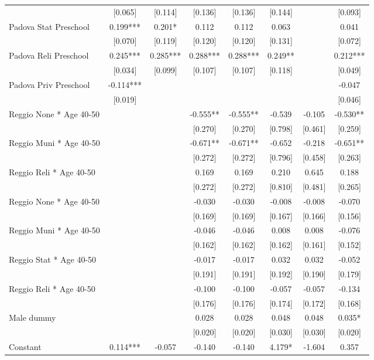 \begin{tabular}{lccccccc}
 & [0.065] & [0.114] & [0.136] & [0.136] & [0.144] &  & [0.093] \\
Padova Stat Preschool & 0.199*** & 0.201* & 0.112 & 0.112 & 0.063 &  & 0.041 \\
 & [0.070] & [0.119] & [0.120] & [0.120] & [0.131] &  & [0.072] \\
Padova Reli Preschool & 0.245*** & 0.285*** & 0.288*** & 0.288*** & 0.249** &  & 0.212*** \\
 & [0.034] & [0.099] & [0.107] & [0.107] & [0.118] &  & [0.049] \\
Padova Priv Preschool & -0.114*** &  &  &  &  &  & -0.047 \\
 & [0.019] &  &  &  &  &  & [0.046] \\
Reggio None * Age 40-50 &  &  & -0.555** & -0.555** & -0.539 & -0.105 & -0.530** \\
 &  &  & [0.270] & [0.270] & [0.798] & [0.461] & [0.259] \\
Reggio Muni * Age 40-50 &  &  & -0.671** & -0.671** & -0.652 & -0.218 & -0.651** \\
 &  &  & [0.272] & [0.272] & [0.796] & [0.458] & [0.263] \\
Reggio Reli * Age 40-50 &  &  & 0.169 & 0.169 & 0.210 & 0.645 & 0.188 \\
 &  &  & [0.272] & [0.272] & [0.810] & [0.481] & [0.265] \\
Reggio None * Age 40-50 &  &  & -0.030 & -0.030 & -0.008 & -0.008 & -0.070 \\
 &  &  & [0.169] & [0.169] & [0.167] & [0.166] & [0.156] \\
Reggio Muni * Age 40-50 &  &  & -0.046 & -0.046 & 0.008 & 0.008 & -0.076 \\
 &  &  & [0.162] & [0.162] & [0.162] & [0.161] & [0.152] \\
Reggio Stat * Age 40-50 &  &  & -0.017 & -0.017 & 0.032 & 0.032 & -0.052 \\
 &  &  & [0.191] & [0.191] & [0.192] & [0.190] & [0.179] \\
Reggio Reli * Age 40-50 &  &  & -0.100 & -0.100 & -0.057 & -0.057 & -0.134 \\
 &  &  & [0.176] & [0.176] & [0.174] & [0.172] & [0.168] \\
Male dummy &  &  & 0.028 & 0.028 & 0.048 & 0.048 & 0.035* \\
 &  &  & [0.020] & [0.020] & [0.030] & [0.030] & [0.020] \\
Constant & 0.114*** & -0.057 & -0.140 & -0.140 & 4.179* & -1.604 & 0.357 \\

\end{tabular}
